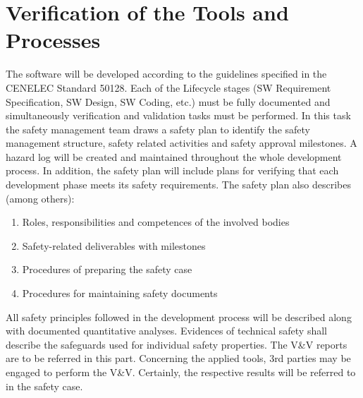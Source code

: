 \section{Verification of the Tools and Processes}
\tbc
The software will be developed according to the guidelines specified in the CENELEC Standard 50128. Each of the Lifecycle stages (SW Requirement Specification, SW Design, SW Coding, etc.) must be fully documented and simultaneously verification and validation tasks must be performed.
In this task the safety management team draws a safety plan to identify the safety management structure, safety related activities and safety approval milestones. A hazard log will be created and maintained throughout the whole development process. In addition, the safety plan will include plans for verifying that each development phase meets its safety requirements. The safety plan also describes (among others):
\begin{enumerate}
\item  Roles, responsibilities and competences of the involved bodies
\item  Safety-related deliverables with milestones
\item  Procedures of preparing the safety case
\item  Procedures for maintaining safety documents
\end{enumerate}
All safety principles followed in the development process will be described along with documented quantitative analyses. Evidences of technical safety shall describe the safeguards used for individual safety properties. The V\&V reports are to be referred in this part.
Concerning the applied tools, 3rd parties may be engaged to perform the V\&V. Certainly, the respective results will be referred to in the safety case.




